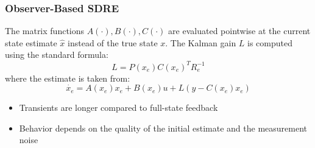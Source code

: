 \subsubsection{Observer-Based SDRE}
The matrix functions $A(\cdot), B(\cdot), C(\cdot)$ are evaluated pointwise at the current state estimate $\hat{x}$ instead of the true state $x$.
\newpar{}
The Kalman gain $L$ is computed using the standard formula:
\begin{equation*}
    L = P(x_e) {C(x_e)}^T R_e^{-1}
\end{equation*}
where the estimate is taken from:
\begin{equation*}
    \dot{x_e} = A(x_e) x_e + B(x_e) u + L(y - C(x_e) x_e)
\end{equation*}

\newpar{}

\begin{itemize}
    \item Transients are longer compared to full-state feedback
    \item Behavior depends on the quality of the initial estimate and the measurement noise
\end{itemize}

